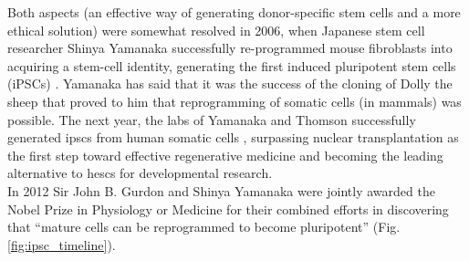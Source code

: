Both aspects (an effective way of generating donor-specific stem cells and a more ethical solution) were somewhat resolved in 2006, when Japanese stem cell researcher Shinya Yamanaka successfully re-programmed mouse fibroblasts into acquiring a stem-cell identity, generating the first induced pluripotent stem cells (iPSCs) \cite{takahashi2006induction}.
Yamanaka has said that it was the success of the cloning of Dolly the sheep that proved to him that reprogramming of somatic cells (in mammals) was possible.
The next year, the labs of Yamanaka and Thomson successfully generated \glspl{ipsc} from human somatic cells \cite{takahashi2006induction, takahashi2007induction, yu2007induced}, surpassing nuclear transplantation as the first step toward effective regenerative medicine and becoming the leading alternative to \glspl{hesc} for developmental research.\\

In 2012 Sir John B. Gurdon and Shinya Yamanaka were jointly awarded the Nobel Prize in Physiology or Medicine for their combined efforts in discovering that “mature cells can be reprogrammed to become pluripotent” \cite{nobel2012press} (Fig. \ref{fig:ipsc_timeline}).    






